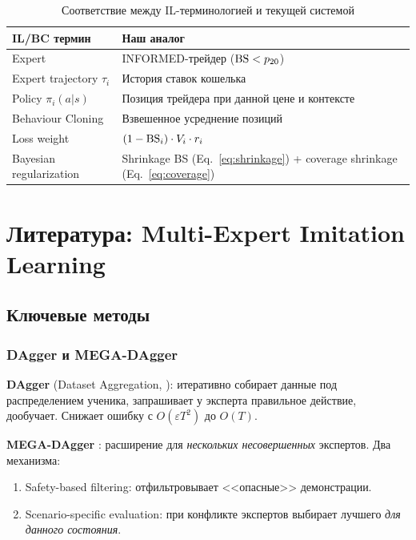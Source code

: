 \begin{table}[h]
\centering
\begin{tabular}{ll}
\toprule
\textbf{IL/BC термин} & \textbf{Наш аналог} \\
\midrule
Expert                        & INFORMED-трейдер ($\mathrm{BS} < p_{20}$) \\
Expert trajectory $\tau_i$    & История ставок кошелька \\
Policy $\pi_i(a|s)$           & Позиция трейдера при данной цене и контексте \\
Behaviour Cloning             & Взвешенное усреднение позиций \\
Loss weight                   & $(1 - \mathrm{BS}_i) \cdot V_i \cdot r_i$ \\
Bayesian regularization       & Shrinkage BS (Eq.~\ref{eq:shrinkage}) + coverage shrinkage (Eq.~\ref{eq:coverage}) \\
\bottomrule
\end{tabular}
\caption{Соответствие между IL-терминологией и текущей системой}
\label{tab:mapping}
\end{table}

\section{Литература: Multi-Expert Imitation Learning}
\label{sec:literature}

\subsection{Ключевые методы}

\subsubsection{DAgger и MEGA-DAgger}

\textbf{DAgger} (Dataset Aggregation, \citealt{ross2011reduction}):
итеративно собирает данные под распределением ученика,
запрашивает у эксперта правильное действие, дообучает.
Снижает ошибку с $O(\varepsilon T^2)$ до $O(T)$.

\textbf{MEGA-DAgger} \citep{sun2023mega}:
расширение для \emph{нескольких несовершенных} экспертов.
Два механизма:
\begin{enumerate}[nosep]
  \item Safety-based filtering: отфильтровывает <<опасные>> демонстрации.
  \item Scenario-specific evaluation: при конфликте экспертов выбирает
    лучшего \emph{для данного состояния}.
\end{enumerate}

